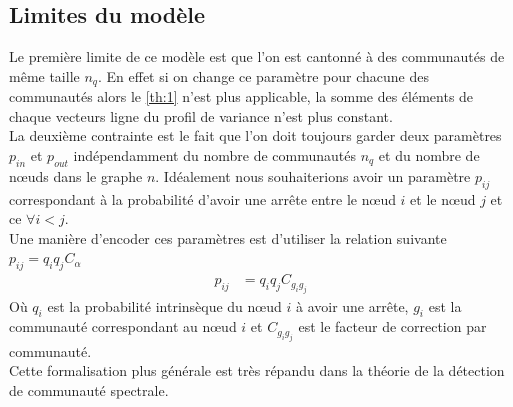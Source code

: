 \subsection{Limites du modèle}
Le première limite de ce modèle est que l'on est cantonné à des communautés de même taille $n_q$.
En effet si on change ce paramètre pour chacune des communautés alors le \autoref{th:1} n'est plus applicable, la somme des éléments de chaque vecteurs ligne du profil de variance n'est plus constant.\\

La deuxième contrainte est le fait que l'on doit toujours garder deux paramètres $p_{in}$ et $p_{out}$ indépendamment du nombre de communautés $n_q$ et du nombre de nœuds dans le graphe $n$.
Idéalement nous souhaiterions avoir un paramètre $p_{ij}$ correspondant à la probabilité d'avoir une arrête entre le nœud $i$ et le nœud $j$ et ce $\forall i<j$.\\
Une manière d'encoder ces paramètres est d'utiliser la relation suivante $p_{ij} = q_iq_jC_{\alpha}$
\begin{align}
	p_{ij} &= q_iq_jC_{g_ig_j}
\end{align}
Où $q_i$ est la probabilité intrinsèque du nœud $i$ à avoir une arrête, $g_i$ est la communauté correspondant au nœud $i$ et $C_{g_ig_j}$ est le facteur de correction par communauté.\\
Cette formalisation plus générale est très répandu dans la théorie de la détection de communauté spectrale.